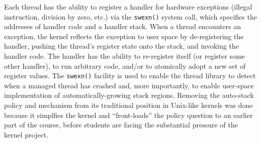 Each thread has the ability to register a handler
for hardware exceptions (illegal instruction,
division by zero, etc.)
via the \texttt{swexn()} system call,
which specifies the addresses of handler code
and a handler stack.
When a thread encounters an exception,
the kernel reflects the exception to user space
by
de-registering the handler,
pushing the thread's register state onto the stack,
and invoking the handler code.
The handler has the ability to re-register itself
(or register some other handler),
to run arbitrary code,
and/or to atomically adopt a new set of register
values.
The \texttt{swexn()} facility is used to enable
the thread library to detect when a managed
thread has crashed
and, more importantly,
to enable user-space
implementation of automatically-growing stack
regions.
Removing the auto-stack policy and mechanism from
its traditional position in Unix-like kernels
was done because it simplfies the kernel and
``front-loads'' the policy question to an earlier
part of the course,
before students are facing the substantial pressure
of the kernel project.
